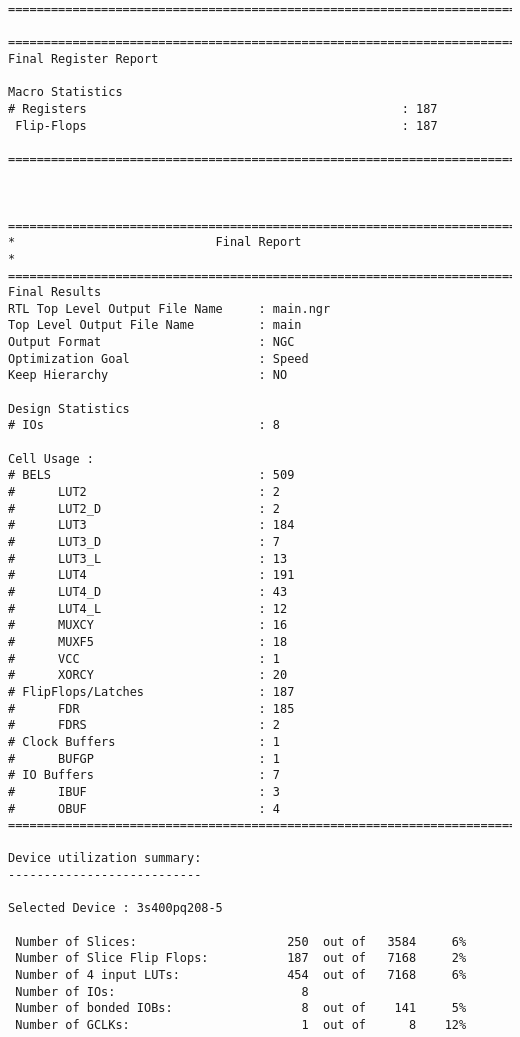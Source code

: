 \documentclass[14pt]{report}
\begin{document}
{\begin{verbatim}
=========================================================================

=========================================================================
Final Register Report

Macro Statistics
# Registers                                            : 187
 Flip-Flops                                            : 187

=========================================================================



=========================================================================
*                            Final Report                               *
=========================================================================
Final Results
RTL Top Level Output File Name     : main.ngr
Top Level Output File Name         : main
Output Format                      : NGC
Optimization Goal                  : Speed
Keep Hierarchy                     : NO

Design Statistics
# IOs                              : 8

Cell Usage :
# BELS                             : 509
#      LUT2                        : 2
#      LUT2_D                      : 2
#      LUT3                        : 184
#      LUT3_D                      : 7
#      LUT3_L                      : 13
#      LUT4                        : 191
#      LUT4_D                      : 43
#      LUT4_L                      : 12
#      MUXCY                       : 16
#      MUXF5                       : 18
#      VCC                         : 1
#      XORCY                       : 20
# FlipFlops/Latches                : 187
#      FDR                         : 185
#      FDRS                        : 2
# Clock Buffers                    : 1
#      BUFGP                       : 1
# IO Buffers                       : 7
#      IBUF                        : 3
#      OBUF                        : 4
=========================================================================

Device utilization summary:
---------------------------

Selected Device : 3s400pq208-5 

 Number of Slices:                     250  out of   3584     6%  
 Number of Slice Flip Flops:           187  out of   7168     2%  
 Number of 4 input LUTs:               454  out of   7168     6%  
 Number of IOs:                          8
 Number of bonded IOBs:                  8  out of    141     5%  
 Number of GCLKs:                        1  out of      8    12%  


\end{verbatim}}
\end{document}
